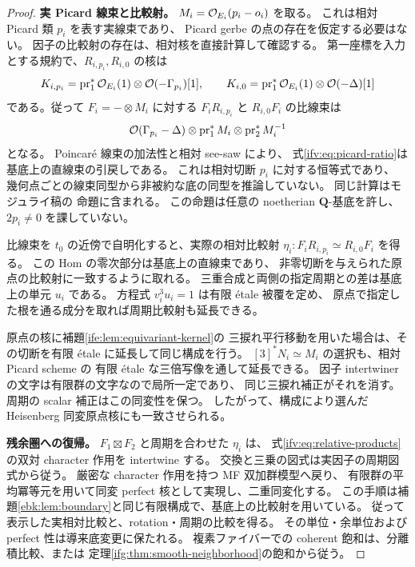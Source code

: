 \begin{proof}
\textbf{実 Picard 線束と比較射。}
$M_i=\mathcal O_{E_i}(p_i-o_i)$ を取る。
これは相対 Picard 類 $p_i$ を表す実線束であり、
Picard gerbe の点の存在を仮定する必要はない。
因子の比較射の存在は、相対核を直接計算して確認する。
第一座標を入力とする規約で、$R_{i,p_i},R_{i,0}$ の核は
\[
 K_{i,p_i}=\operatorname{pr}_1^*\mathcal O_{E_i}(1)
                      \otimes\mathcal O(-\Gamma_{p_i})[1],
 \qquad
 K_{i,0}=\operatorname{pr}_1^*\mathcal O_{E_i}(1)
                      \otimes\mathcal O(-\Delta)[1]
\]
である。従って $F_i=-\otimes M_i$ に対する
$F_iR_{i,p_i}$ と $R_{i,0}F_i$ の比線束は
\begin{equation}\label{ifv:eq:picard-ratio}
 \mathcal O(\Gamma_{p_i}-\Delta)\otimes
       \operatorname{pr}_1^*M_i\otimes\operatorname{pr}_2^*M_i^{-1}
\end{equation}
となる。
Poincar\'e 線束の加法性と相対 see-saw により、
式\eqref{ifv:eq:picard-ratio}は基底上の直線束の引戻しである。
これは相対切断 $p_i$ に対する恒等式であり、
幾何点ごとの線束同型から非被約な底の同型を推論していない。
同じ計算はモジュライ稿の
命題に含まれる。
この命題は任意の noetherian $\mathbf Q$-基底を許し、$2p_i\ne0$ を課していない。

比線束を $t_0$ の近傍で自明化すると、実際の相対比較射
$\eta_i:F_iR_{i,p_i}\simeq R_{i,0}F_i$ を得る。
この Hom の零次部分は基底上の直線束であり、
非零切断を与えられた原点の比較射に一致するように取れる。
三重合成と両側の指定周期との差は基底上の単元 $u_i$ である。
方程式 $v_i^3u_i=1$ は有限 \'etale 被覆を定め、
原点で指定した根を通る成分を取れば周期比較射も延長できる。

原点の核に補題\ref{ife:lem:equivariant-kernel}の
三捩れ平行移動を用いた場合は、その切断を有限 \'etale に延長して同じ構成を行う。
$[3]^*N_i\simeq M_i$ の選択も、相対 Picard scheme の
有限 \'etale な三倍写像を通して延長できる。
因子 intertwiner の文字は有限群の文字なので局所一定であり、
同じ三捩れ補正がそれを消す。周期の scalar 補正はこの同変性を保つ。
したがって、構成により選んだ Heisenberg 同変原点核にも一致させられる。

\textbf{残余圏への復帰。}
$F_1\boxtimes F_2$ と周期を合わせた $\eta_i$ は、
式\eqref{ifv:eq:relative-products}の双対 character 作用を intertwine する。
交換と三乗の図式は実因子の周期図式から従う。
厳密な character 作用を持つ MF 双加群模型へ戻り、
有限群の平均冪等元を用いて同変 perfect 核として実現し、二重同変化する。
この手順は補題\ref{ebk:lem:boundary}と同じ有限構成で、基底上の比較射を用いている。
従って表示した実相対比較と、rotation・周期の比較を得る。
その単位・余単位および perfect 性は導来底変更に保たれる。
複素ファイバーでの coherent 飽和は、分離積比較、または
定理\ref{ifg:thm:smooth-neighborhood}の飽和から従う。
\end{proof}

